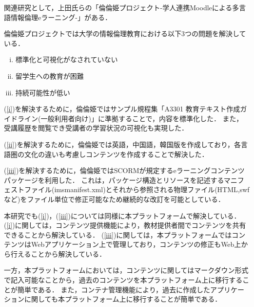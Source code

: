 関連研究として，上田氏らの「倫倫姫プロジェクト-学人連携Moodleによる多言語情報倫理eラーニング-」\cite{rinri}がある．

倫倫姫プロジェクトでは大学の情報倫理教育における以下3つの問題を解決している．

\begin{enumerate}[(i)]
    \item 標準化と可視化がなされていない \label{i}
    \item 留学生への教育が困難 \label{ii}
    \item 持続可能性が低い \label{iii}
\end{enumerate}

(\ref{i})を解決するために，倫倫姫ではサンプル規程集「A3301 教育テキスト作成ガイドライン(一般利用者向け)」に準拠することで，内容を標準化した．
また，受講履歴を閲覧でき受講者の学習状況の可視化も実現した．

(\ref{ii})を解決するために，倫倫姫では英語，中国語，韓国版を作成しており，各言語圏の文化の違いも考慮しコンテンツを作成することで解決した．

(\ref{iii})を解決するために，倫倫姫ではSCORMが規定するeラーニングコンテンツパッケージを利用した．
これは，パッケージ構造とリソースを記述するマニフェストファイル(imsmanifest.xml)とそれから参照される物理ファイル(HTML,swfなど)をファイル単位で修正可能なため継続的な改訂を可能としている．

本研究でも(\ref{i})，(\ref{iii})については同様に本プラットフォームで解決している．
(\ref{i})に関しては，コンテンツ提供機能により，教材提供者間でコンテンツを共有できることから解決している．
(\ref{iii})に関しては，本プラットフォームではコンテンツはWebアプリケーション上で管理しており，コンテンツの修正もWeb上から行えることから解決している．

一方，本プラットフォームにおいては，コンテンツに関してはマークダウン形式で記入可能なことから，過去のコンテンツを本プラットフォーム上に移行することが簡単である．
また，コンテナ管理機能により，過去に作成したアプリケーションに関しても本プラットフォーム上に移行することが簡単である．

